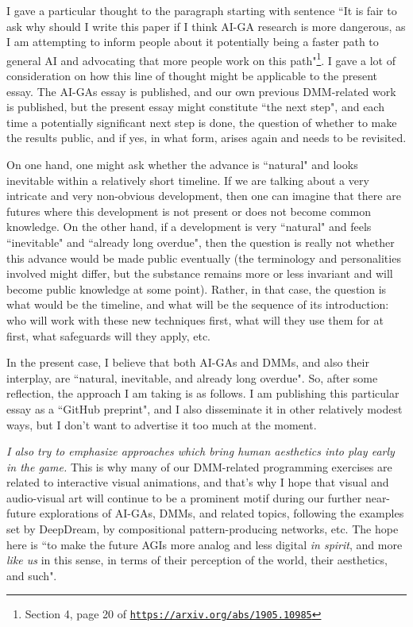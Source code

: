 \documentclass{article}
\begin{document}
I gave a particular thought to the paragraph starting with sentence 
``It is fair to ask why should I write this paper if I think 
AI-GA research is more dangerous, as I am attempting to inform people 
about it potentially being a faster path to general AI and advocating that more people work on this path"\footnote{Section 4,
page 20 of \href{https://arxiv.org/abs/1905.10985}{\tt https://arxiv.org/abs/1905.10985}}. I gave a lot of
consideration on how this line of thought might be applicable to the present essay. The AI-GAs essay is published,
and our own previous DMM-related work is published, but the present essay might constitute ``the next step",
and each time a potentially significant next step is done, the question of whether to make the results public,
and if yes, in what form, arises again and needs to be revisited.

On one hand, one might ask whether the advance is ``natural" and looks inevitable within a relatively short
timeline. If we are talking about a very intricate and very non-obvious development, 
then one can imagine that there are futures where this development is not present or does not
become common knowledge.
On the other hand, if a development is very ``natural" and feels ``inevitable" and ``already long overdue", 
then the question is really not whether this advance would be made public 
eventually (the terminology and personalities involved might differ, but the substance remains
more or less invariant and will become public knowledge at some point). 
Rather, in that case, the question is what would be the timeline, 
and what will be the sequence of its introduction: who will work with these new techniques first,
what will they use them for at first, what safeguards will they apply, etc.

In the present case, I believe that both AI-GAs and DMMs, and also their interplay, are 
``natural, inevitable, and already long overdue". So, after some reflection, the approach I am taking
is as follows. I am publishing this particular essay as a ``GitHub preprint", and I also disseminate it in other relatively modest ways, but I don't want to advertise it too much at the moment.

{\em I also try to emphasize approaches which bring human aesthetics into play early in the game.}
This is why many of our DMM-related programming exercises are related to interactive visual animations,
and that's why I hope that visual and audio-visual art will continue to be a prominent motif during our further near-future explorations
of AI-GAs, DMMs, and related topics, following the examples set by DeepDream, by compositional pattern-producing networks, etc. The hope here is ``to make the future AGIs more analog and less digital {\em in spirit}, and more {\em like us} in this sense, 
in terms of their perception of the world, their aesthetics, and such".
\end{document}
